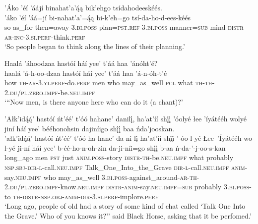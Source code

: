 \ea\label{ex:text1-23-6}
’Áko ’éí ’áájí binahat’a’ą́ą bik’ehgo tsídahodeeskéés.\\
\gll ’áko	’éí	’áá=jí	bi-nahat’a’=ą́ą	bi-k’eh=go	tsí-da-ho-d-ees-kéés\\
     so	as\_for	then=away	3.\textsc{bi}.\textsc{poss}-plan=\textsc{pst}.\textsc{ref}	3.\textsc{bi}.\textsc{poss}-manner=\textsc{sub}	mind-\textsc{distr}-\textsc{ar}-\textsc{inc}-3.\textsc{si}.\textsc{perf}-think.\textsc{perf}\\
\glt `So people began to think along the lines of their planning.'
\z

\ea\label{ex:text1-23-7}
Haalá ’áhoodzaa hastóí háí yee’ t’áá haa ’ánóht’é?\\
\gll haalá	’á-h-oo-dzaa	hastóí	háí	yee’	t’áá	haa	’á-n-óh-t’é\\
     how	\textsc{th}-\textsc{ar}-3.\textsc{yi}.\textsc{perf}-do.\textsc{perf}	men	who	may\_as\_well	\textsc{pcl}	what	\textsc{th}-\textsc{th}-2.\textsc{du}/\textsc{pl}.\textsc{zero}.\textsc{impf}-be.\textsc{neu}.\textsc{impf}\\
\glt `{``}Now men, is there anyone here who can do it (a chant)?'
\z

\ea\label{ex:text1-23-8}
’Ałk’idą́ą́’ hastóí ńt’éé’ t’óó hahane’ danilį́, ha’at’íí shį́į́ ’óolyé łee ’íyátééh wolyé jiní háí yee’ bééhonohsin dajiníigo shį́į́ baa ńda’jooskan.\\
\gll ’ałk’idą́ą́’	hastóí	ńt’éé’	t’óó	ha-hane’	da-ni-lį́	ha’at’íí	shį́į́	’-óo-l-yé	Łee~{’Íyátééh}	wo-l-yé	ji-ní	háí	yee’	b-éé-ho-n-oh-zin	da-ji-níi=go	shį́į́	b-aa	ń-da-’-j-oo-s-kan\\
     long\_ago	men	\textsc{pst}	just	\textsc{anim}.\textsc{poss}-story	\textsc{distr}-\textsc{th}-be.\textsc{neu}.\textsc{impf}	what	probably	\textsc{nsp}.\textsc{sbj}-\textsc{dir}-\textsc{l}-call.\textsc{neu}.\textsc{impf}	Talk\_One\_Into\_the\_Grave	\textsc{dir}-\textsc{l}-call.\textsc{neu}.\textsc{impf}	\textsc{anim}-say.\textsc{neu}.\textsc{impf}	who	may\_as\_well	3.\textsc{bi}.\textsc{poss}-against\_around-\textsc{ar}-\textsc{th}-2.\textsc{du}/\textsc{pl}.\textsc{zero}.\textsc{impf}-know.\textsc{neu}.\textsc{impf}	\textsc{distr}-\textsc{anim}-say.\textsc{neu}.\textsc{impf}=\textsc{sub}	probably	3.\textsc{bi}.\textsc{poss}-to	\textsc{th}-\textsc{distr}-\textsc{nsp}.\textsc{obj}-\textsc{anim}-\textsc{dir}-3.\textsc{si}.\textsc{perf}-implore.\textsc{perf}\\
\glt `Long ago, people of old had a story of some kind of chat called `Talk One Into the Grave.' Who of you knows it?'' said Black Horse, asking that it be perfomed.'
\z


